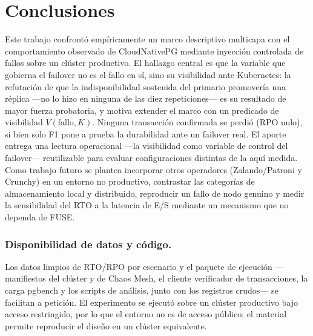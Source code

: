 \documentclass[a4paper]{llncs}
\begin{document}
\section{Conclusiones}
\label{sec:conclusiones}

Este trabajo confrontó empíricamente un marco descriptivo multicapa
\cite{parejo2026} con el comportamiento observado de CloudNativePG mediante
inyección controlada de fallos sobre un clúster productivo. El hallazgo central es
que la variable que gobierna el failover no es el fallo en sí, sino su visibilidad
ante Kubernetes: la refutación de que la indisponibilidad sostenida del primario
promovería una réplica ---no lo hizo en ninguna de las diez repeticiones--- es su
resultado de mayor fuerza probatoria, y motiva extender el marco con un predicado
de visibilidad $V(\text{fallo}, K)$. Ninguna transacción confirmada se perdió (RPO
nulo), si bien solo F1 pone a prueba la durabilidad ante un failover real. El
aporte entrega una lectura operacional ---la visibilidad como variable de control
del failover--- reutilizable para evaluar configuraciones distintas de la aquí
medida. Como trabajo futuro se plantea incorporar otros operadores (Zalando/Patroni
y Crunchy) en un entorno no productivo, contrastar las categorías de almacenamiento
local y distribuido, reproducir un fallo de nodo genuino y medir la sensibilidad
del RTO a la latencia de E/S mediante un mecanismo que no dependa de FUSE.

\subsubsection*{Disponibilidad de datos y código.}
Los datos limpios de RTO/RPO por escenario y el paquete de ejecución ---manifiestos
del clúster y de Chaos Mesh, el cliente verificador de transacciones, la carga
pgbench y los scripts de análisis, junto con los registros crudos--- se facilitan
a petición. El experimento se ejecutó sobre un clúster productivo bajo acceso
restringido, por lo que el entorno no es de acceso público; el material permite
reproducir el diseño en un clúster equivalente.
\end{document}
